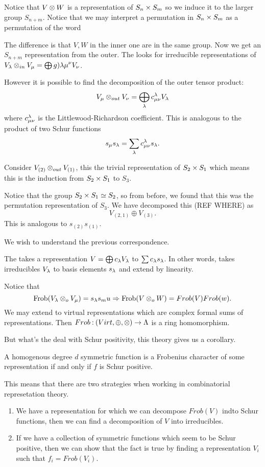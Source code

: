 \documentclass[12pt]{memoir}
\begin{document}
Notice that $V\otimes W$ is a representation of $S_n\times S_m$ so we induce it to the larger group $S_{n+m}$. Notice that we may interpret a permutation in $S_n\times S_m$ as a permutation of the word 

The difference is that $V,W$ in the inner one are in the same group. Now we get an $S_{n+m}$ representation from the outer.  The  looks for irreducible representations of $V_\lambda\otimes_{in}V_{\mu}=\bigoplus g){\lambda\mu}^\nu V_\nu$.\par 
However it is possible to find the decomposition of the outer tensor product:
$$V_\mu\otimes_{out}V_\nu=\bigoplus_\lambda c_{\mu\nu}^{\lambda}V_\lambda$$
where $c_{\mu\nu}^\lambda$ is the Littlewood-Richardson coefficient. This is analogous to the product of two Schur functions
$$s_\mu s_\lambda=\sum_\lambda c_{\mu\nu}^\lambda s_\lambda.$$
\begin{Ex}
    Consider $V_{(2)}\otimes_{out}V_{(1)}$, this the trivial representation of $S_2\times S_1$ which means this is the induction from $S_2\times S_1$ to $S_3$.\par 
    Notice that the group $S_2\times S_1\simeq S_2$, so from before, we found that this was the permutation representation of $S_3$. We have decomposed this (REF WHERE) as 
    $$V_{(2,1)}\oplus V_{(3)}.$$
    This is analogous to $s_{(2)}s_{(1)}$.
\end{Ex}
 We wish to understand the previous correspondence. 

\begin{Def}
    The  takes a representation $V=\bigoplus c_\lambda V_\lambda$ to $\sum c_\lambda s_\lambda$. In other words, takes irreducibles $V_\lambda$ to basis elements $s_\lambda$ and extend by linearity.
\end{Def}

Notice that 
$$\text{Frob}(V_\lambda\otimes_oV_\mu)=s_\lambda s_mu\Rightarrow \text{Frob}(V\otimes_oW)=Frob(V)Frob(w).$$
We may extend to virtual representations which are complex formal sums of representations. Then $Frob\mathbin{:} (Virt,\oplus,\otimes)\to\Lambda$ is a ring homomorphism.\par 
But what's the deal with Schur positivity, this theory gives us a corollary.

\begin{Cor}
    A homogenous degree $d$ symmetric function is a Frobenius character of some representation if and only if $f$ is Schur positive.
\end{Cor}

This means that there are two strategies when working in combinatorial represetation theory.
\begin{enumerate}
    \item We have a representation for which we can decompose $Frob(V)$ indto Schur functions, then we can find a decomposition of $V$ into irreducibles.
    \item If we have a collection of symmetric functions which seem to be Schur positive, then we can show that the fact is true by finding a representation $V_i$ such that $f_i=Frob(V_i)$.
\end{enumerate}
\end{document}
